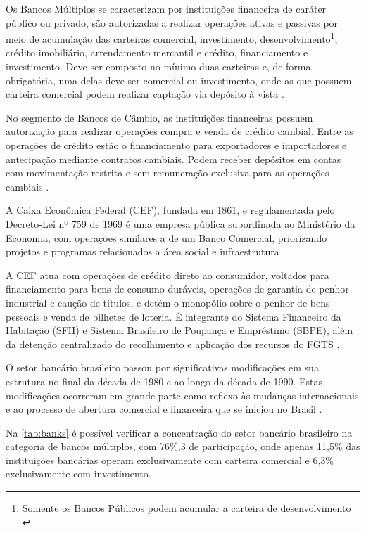 \documentclass[12pt,openright,oneside,a4paper,chapter=TITLE,section=TITLE,subsection=Title,english,french,spanish,portugues,sumario=tradicional]{04-class-files/abntex2}
\begin{document}
Os Bancos Múltiplos se caracterizam por instituições financeira de caráter público ou privado, são autorizadas a realizar operações ativas e passivas por meio de acumulação das carteiras comercial, investimento, desenvolvimento\footnote{Somente os Bancos Públicos podem acumular a carteira de desenvolvimento \cite{Res:2099:1994}}, crédito imobiliário, arrendamento mercantil e crédito, financiamento e investimento. Deve ser composto no mínimo duas carteiras e, de forma obrigatória, uma delas deve ser comercial ou investimento, onde as que possuem carteira comercial podem realizar captação via depósito à vista \cite{Res:2099:1994}.

No segmento de Bancos de Câmbio, as instituições financeiras possuem autorização para realizar operações compra e venda de crédito cambial. Entre as operações de crédito estão o financiamento para exportadores e importadores e antecipação mediante contratos cambiais. Podem receber depósitos em contas com movimentação restrita e sem remuneração exclusiva para as operações cambiais \cite{Res:3426:2006}.

A Caixa Econômica Federal (CEF), fundada em 1861, e regulamentada pelo Decreto-Lei nº 759 de 1969 é uma empresa pública subordinada ao Ministério da Economia, com operações similares a de um Banco Comercial, priorizando projetos e programas relacionados a área social e infraestrutura \cite{DL:759:1969}.

A CEF atua com operações de crédito direto ao consumidor, voltados para financiamento para bens de consumo duráveis, operações de garantia de penhor industrial e caução de títulos, e detém o monopólio sobre o penhor de bens pessoais e venda de bilhetes de loteria. É integrante do Sistema Financeiro da Habitação (SFH) e Sistema Brasileiro de Poupança e Empréstimo (SBPE), além da detenção centralizado do recolhimento e aplicação dos recursos do FGTS \cite{DL:759:1969}.

O setor bancário brasileiro passou por significativas modificações em sua estrutura no final da década de 1980 e ao longo da década de 1990. Estas modificações ocorreram em grande parte como reflexo às mudanças internacionais e ao processo de abertura comercial e financeira que se iniciou no Brasil \cite{camargo:2009}.

Na \autoref{tab:banks} é possível verificar a concentração do setor bancário brasileiro na categoria de bancos múltiplos, com 76\%,3 de participação, onde apenas 11,5\% das instituições bancárias operam exclusivamente com carteira comercial e 6,3\% exclusivamente com investimento.
\end{document}
